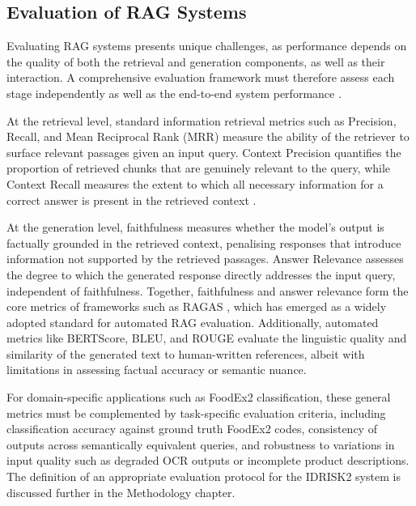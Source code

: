 \hypertarget{evaluation-of-rag-systems}{%
\subsection{Evaluation of RAG Systems}\label{evaluation-of-rag-systems}}

Evaluating RAG systems presents unique challenges, as performance depends on the quality of both the retrieval and generation components, as well as their interaction. A comprehensive evaluation framework must therefore assess each stage independently as well as the end-to-end system performance \parencite{ioannis_papadimitriou_0c7acc17}.

At the retrieval level, standard information retrieval metrics such as Precision, Recall, and Mean Reciprocal Rank (MRR) measure the ability of the retriever to surface relevant passages given an input query. Context Precision quantifies the proportion of retrieved chunks that are genuinely relevant to the query, while Context Recall measures the extent to which all necessary information for a correct answer is present in the retrieved context \parencite{hao_yu_7fec6693}.

At the generation level, faithfulness measures whether the model's output is factually grounded in the retrieved context, penalising responses that introduce information not supported by the retrieved passages. Answer Relevance assesses the degree to which the generated response directly addresses the input query, independent of faithfulness. Together, faithfulness and answer relevance form the core metrics of frameworks such as RAGAS \parencite{andrew_brown_84e43c08}, which has emerged as a widely adopted standard for automated RAG evaluation. Additionally, automated metrics like BERTScore, BLEU, and ROUGE evaluate the linguistic quality and similarity of the generated text to human-written references, albeit with limitations in assessing factual accuracy or semantic nuance.

For domain-specific applications such as FoodEx2 classification, these general metrics must be complemented by task-specific evaluation criteria, including classification accuracy against ground truth FoodEx2 codes, consistency of outputs across semantically equivalent queries, and robustness to variations in input quality such as degraded OCR outputs or incomplete product descriptions. The definition of an appropriate evaluation protocol for the IDRISK2 system is discussed further in the Methodology chapter.


